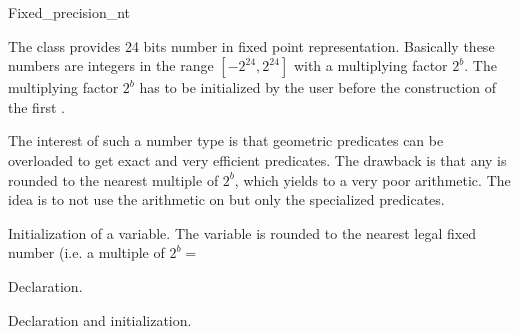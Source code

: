 
\begin{ccClass}{Fixed_precision_nt}

\label{I1_Chapter_Fixed_precision_nt}

The class  provides 24 bits number in 
fixed point representation.
Basically these numbers are integers in the range
$[-2^{24},2^{24}]$ with a multiplying factor $2^b$.
The multiplying factor $2^b$ has to be initialized by the user
before the construction of the first .

The interest of such a number type is that geometric predicates
can be overloaded to get exact and very efficient predicates.
The drawback is that any  is rounded to 
the nearest multiple of $2^b$, which yields to a very poor arithmetic.
The idea is to not use the arithmetic on 
but only the specialized predicates.


\ccSetTwoColumns{}{\hspace*{6.5cm}}

\ccCreation
{}


            {Initialization of a variable. The variable is rounded to the
                nearest legal fixed number (i.e. a multiple of $2^b=$
                }


            {Declaration.}

            {Declaration and initialization.}



\end{ccClass}
